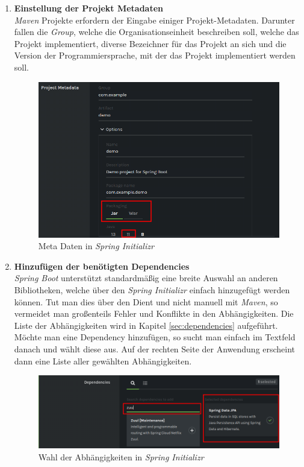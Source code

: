 \begin{enumerate}
\item \textbf{Einstellung der Projekt Metadaten}\\
\textit{Maven} Projekte erfordern der Eingabe einiger Projekt-Metadaten. Darunter fallen die \textit{Group}, welche die Organisationseinheit beschreiben soll, welche das Projekt implementiert, diverse Bezeichner für das Projekt an sich und die Version der Programmiersprache, mit der das Projekt implementiert werden soll. 
\begin{figure}[H]
\centering
\includegraphics[width=\pictureWidth cm]{Bilder/Kapitel_4/init_meta.png}
\caption{Meta Daten in \textit{Spring Initializr}\label{fig:init_meta}}
\end{figure}

\item \textbf{Hinzufügen der benötigten Dependencies}\\
\textit{Spring Boot} unterstützt standardmäßig eine breite Auswahl an anderen Bibliotheken, welche über den \textit{Spring Initializr} einfach hinzugefügt werden können. Tut man dies über den Dient und nicht manuell mit \textit{Maven}, so vermeidet man großenteils Fehler und Konflikte in den Abhängigkeiten. Die Liste der Abhängigkeiten wird in Kapitel \ref{sec:dependencies} aufgeführt. Möchte man eine Dependency hinzufügen, so sucht man einfach im Textfeld danach und wählt diese aus. Auf der rechten Seite der Anwendung erscheint dann eine Liste aller gewählten Abhängigkeiten.
\begin{figure}[H]
\centering
\includegraphics[width=\pictureWidth cm]{Bilder/Kapitel_4/init_dep.png}
\caption{Wahl der Abhängigkeiten in \textit{Spring Initializr}\label{fig:init_dep}}
\end{figure}

\end{enumerate}

